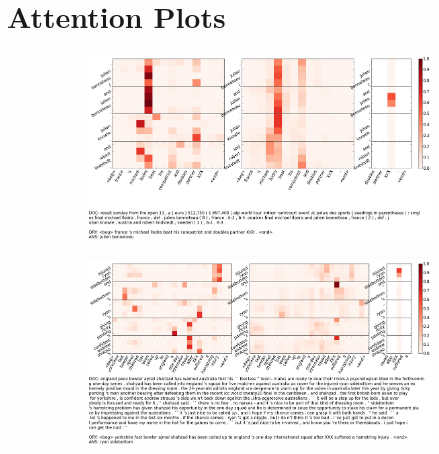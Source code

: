 \documentclass[11pt,a4paper]{article}
\begin{document}
\section{Attention Plots}
\begin{figure}[h]
\centering
\caption{Layer-wise attention visualization of GA Reader trained on WDW-Strict. See text for details.}
\begin{subfigure}[b]{\textwidth}
\centering
\includegraphics[width=\linewidth]{attention_plots/AFP_ENG_20100221_0186_question.png}
\end{subfigure}
\begin{subfigure}[b]{\textwidth}
\centering
\includegraphics[width=\linewidth]{attention_plots/APW_ENG_20100615_0750_question.png}
\end{subfigure}
\end{figure}
\end{document}
